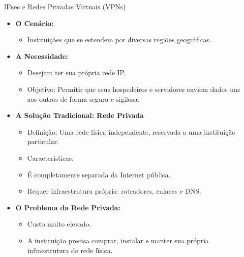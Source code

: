 \begin{frame}{IPsec e Redes Privadas Virtuais (VPNs)}
    \begin{itemize}
        \item \textbf{O Cenário:}
              \begin{itemize}
                  \item Instituições que se estendem por diversas regiões geográficas.
              \end{itemize}

        \item \textbf{A Necessidade:}
              \begin{itemize}
                  \item Desejam ter sua própria rede IP.
                  \item Objetivo: Permitir que seus hospedeiros e servidores enviem dados uns aos outros de forma segura e sigilosa.
              \end{itemize}

        \item \textbf{A Solução Tradicional: Rede Privada}
              \begin{itemize}
                  \item Definição: Uma rede física independente, reservada a uma instituição particular.
                  \item Características:
                  \item É completamente separada da Internet pública.
                  \item Requer infraestrutura própria: roteadores, enlaces e DNS.
              \end{itemize}

        \item \textbf{O Problema da Rede Privada:}
              \begin{itemize}
                  \item Custo muito elevado.
                  \item A instituição precisa comprar, instalar e manter sua própria infraestrutura de rede física.
              \end{itemize}
    \end{itemize}
\end{frame}

